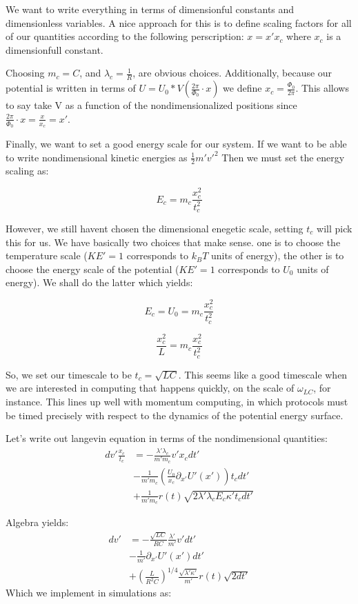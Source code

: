 \documentclass[paper=a4, twocolumn, fontsize=10pt]{article} %
\numberwithin{equation}{section} %
\numberwithin{figure}{section} %
\numberwithin{table}{section} %
\begin{document}
We want to write everything in terms of dimensionful constants and dimensionless variables. A nice approach for this is to define scaling factors for all of our quantities according to the following perscription: $ x = x' x_c$ where $x_c$ is a dimensionfull constant.

Choosing $m_c = C $, and $\lambda_c = \frac{1}{R}$, are obvious choices. Additionally, because our potential is written in terms of $U = U_0 * V(\frac{2\pi}{\Phi_0} \cdot x) $ we define $x_c = \frac{\Phi_0}{2\pi}$. This allows to say take V as a function of the nondimensionalized positions since $\frac{2\pi}{\Phi_0} \cdot x = \frac{x}{x_c} = x' $.


Finally, we want to set a good energy scale for our system. If we want to be able to write nondimensional kinetic energies as $\frac{1}{2} m' v'^2$ Then we must set the energy scaling as:

\[ E_c  = m_c \frac{ x^2_c}{t^2_c} \]

However, we still havent chosen the dimensional enegetic scale, setting $t_c$ will pick this for us. We have basically two choices that make sense. one is to choose the temperature scale ($KE'=1$ corresponds to $k_B T$ units of energy), the other is to choose the energy scale of the potential ($KE'=1$ corresponds to $U_0$ units of energy). We shall do the latter which yields:

\[ E_c = U_0 = m_c \frac{ x^2_c}{t^2_c} \]

\[ \frac{x_c^2}{L} = m_c \frac{ x^2_c}{t^2_c} \]

So, we set our timescale to be $t_c = \sqrt{LC} $. This seems like a good timescale when we are interested in computing that happens quickly, on the scale of $\omega_{LC}$, for instance. This lines up well with momentum computing, in which protocols must be timed precisely with respect to the dynamics of the potential energy surface.


Let's write out langevin equation in terms of the nondimensional quantities:
\begin{align*}
dv' \frac{x_c}{t_c} &= -\frac{\lambda' \lambda_c}{m' m_c} v' x_c  dt' \\
 &- \frac{1}{m' m_c} \left(\frac{U_0}{x_c} \partial_{x'} U'(x')\right)  t_c dt' \\
  &+ \frac{1}{m'm_c} r(t)\sqrt{2\lambda'\lambda_c E_c \kappa' t_c dt'}
\end{align*}
    
Algebra yields:
\begin{align*}
dv' &= -\frac{\sqrt{LC} }{ RC} \frac{\lambda'}{m'} v' dt' \\
&- \frac{1 }{ m'}  \partial_{x'} U'(x') dt' \\
&+ \left(  \frac{L}{R^2 C} \right)^{1/4} \frac{\sqrt{\lambda'\kappa'}}{m'} r(t) \sqrt {2 dt'}
\end{align*}
Which we implement in simulations as:
\end{document}
